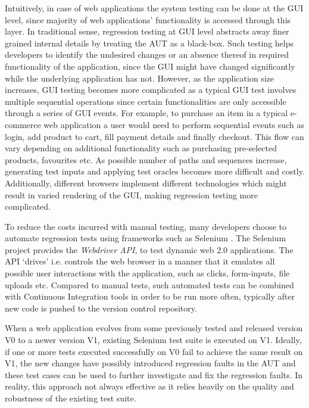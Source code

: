 Intuitively, in case of web applications the system testing can be done at the GUI level, since majority of web applications’ functionality is accessed through this layer. In traditional sense, regression testing at GUI level abstracts away finer grained internal details by treating the AUT as a black-box. Such testing helps developers to identify the undesired  changes or an absence thereof in required functionality of the application, since the GUI might have changed significantly while the underlying application has not. However, as the application size increases, GUI testing becomes more complicated as a typical GUI test involves multiple sequential operations since certain functionalities are only accessible through a series of GUI events. For example, to purchase an item in a typical e-commerce web application a user would need to perform sequential events such as login, add product to cart, fill payment details and finally checkout. This flow can vary depending on additional functionality such as purchasing pre-selected products, favourites etc. As possible number of paths and sequences increase, generating test inputs and applying test oracles becomes more difficult and costly. Additionally, different browsers implement different technologies which might result in varied rendering of the GUI, making regression testing more complicated.

To reduce the costs incurred with manual testing, many developers choose to automate regression tests using frameworks such as Selenium \cite{websiteSelenium}. The Selenium project provides the \textit{Webdriver API}, to test dynamic web 2.0 applications. The API ‘drives’ i.e. controls the web browser in a manner that it emulates all possible user interactions with the application, such as clicks, form-inputs, file uploads etc. Compared to manual tests, such automated tests can be combined with Continuous Integration tools in order to be run more often, typically after new code is pushed to the version control repository. 

When a web application evolves from some previously tested and released version V0 to a newer version V1, existing Selenium test suite is executed on V1. Ideally, if one or more tests executed successfully on V0 fail to achieve the same result on V1, the new changes have possibly introduced regression faults in the AUT and these test cases can be used to further investigate and fix the regression faults. In reality, this approach not always effective as it relies heavily on the quality and robustness of the existing test suite. 

